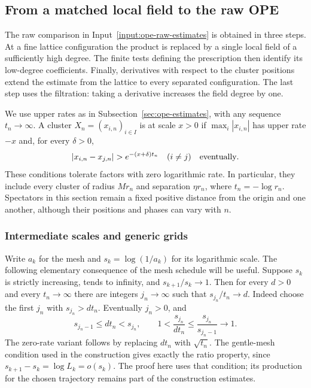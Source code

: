 \subsection{From a matched local field to the raw OPE}
\label{sec:ope-grid}
The raw comparison in Input~\ref{input:ope-raw-estimates} is obtained in
three steps. At a fine lattice configuration the product is replaced by a
single local field of a sufficiently high degree. The finite tests defining
the prescription then identify its low-degree coefficients. Finally,
derivatives with respect to the cluster positions extend the estimate from
the lattice to every separated configuration. The last step uses the
filtration: taking a derivative increases the field degree by one.

We use upper rates as in Subsection~\ref{sec:ope-estimates}, with any sequence
$t_n\to\infty$. A cluster $X_n=(x_{i,n})_{i\in I}$ is at scale $x>0$
if $\max_i|x_{i,n}|$ has upper rate $-x$ and, for every $\delta>0$,
\[
 |x_{i,n}-x_{j,n}|>e^{-(x+\delta)t_n}\quad(i\ne j)
 \quad\hbox{eventually}.
\]
These conditions tolerate factors with zero logarithmic rate. In particular,
they include every cluster of radius $Mr_n$ and separation $\eta r_n$,
where $t_n=-\log r_n$. Spectators in this section remain a fixed positive
distance from the origin and one another, although their positions and
phases can vary with $n$.

\subsubsection{Intermediate scales and generic grids}
Write $a_k$ for the mesh and $s_k=\log(1/a_k)$ for its logarithmic scale.
The following elementary consequence of the mesh schedule will be useful.
Suppose $s_k$ is strictly increasing, tends to infinity, and
$s_{k+1}/s_k\to1$. Then for every $d>0$ and every $t_n\to\infty$
there are integers $j_n\to\infty$ such that $s_{j_n}/t_n\to d$.
Indeed choose the first $j_n$ with $s_{j_n}>dt_n$. Eventually $j_n>0$,
and
\[
 s_{j_n-1}\leq dt_n<s_{j_n},\qquad
 1<\frac{s_{j_n}}{dt_n}\leq\frac{s_{j_n}}{s_{j_n-1}}\longrightarrow1.
\]
The zero-rate variant follows by replacing $dt_n$ with $\sqrt{t_n}$.
The gentle-mesh condition used in the construction gives exactly the
ratio property, since $s_{k+1}-s_k=\log L_k=o(s_k)$.
The proof here uses that condition; its production for the chosen
trajectory remains part of the construction estimates.


